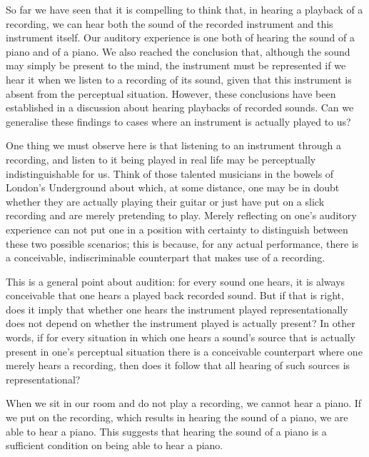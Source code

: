 \documentclass[sloppy, journal, git, bytitle, dodraft]{humapap}
\begin{document}

\sect So far we have seen that it is compelling to think that, in hearing a playback of a recording, we can hear both the sound of the recorded instrument and this instrument itself. Our auditory experience is one both of hearing the sound of a piano and of a piano. We also reached the conclusion that, although the sound may simply be present to the mind, the instrument must be represented if we hear it when we listen to a recording of its sound, given that this instrument is absent from the perceptual situation. However, these conclusions have been established in a discussion about hearing playbacks of recorded sounds. Can we generalise these findings to cases where an instrument is actually played to us? 

One thing we must observe here is that listening to an instrument through a recording, and listen to it being played in real life may be perceptually indistinguishable for us. Think of those talented musicians in the bowels of London's Underground about which, at some distance, one may be in doubt whether they are actually playing their guitar or just have put on a slick recording and are merely pretending to play. Merely reflecting on one's auditory experience can not put one in a position with certainty to distinguish between these two possible scenarios; this is because, for any actual performance, there is a conceivable, indiscriminable counterpart that makes use of a recording. 

This is a general point about audition: for every sound one hears, it is always conceivable that one hears a played back recorded sound. But if that is right, does it imply that whether one hears the instrument played representationally does not depend on whether the instrument played is actually present? In other words, if for every situation in which one hears a sound's source that is actually present in one's perceptual situation there is a conceivable counterpart where one merely hears a recording, then does it follow that all hearing of such sources is representational? 


When we sit in our room and do not play a recording, we cannot hear a piano. If we put on the recording, which results in hearing the sound of a piano, we are able to hear a piano. This suggests that hearing the sound of a piano is a sufficient condition on being able to hear a piano. 
\end{document}
